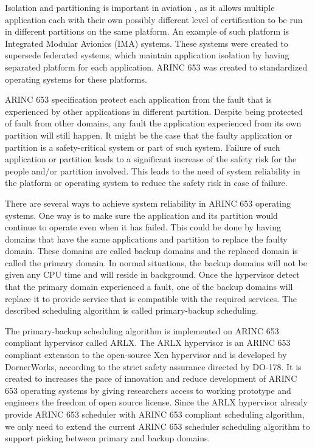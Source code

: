 \documentclass[conference]{IEEEtran}
\begin{document}
Isolation and partitioning is important in aviation \cite{Rushby2000}, as it allows multiple
application each with their own possibly different level of certification to be run in different
partitions on the same platform. An example of such platform is Integrated Modular Avionics
(IMA) systems. These systems were created to supersede federated systems, which maintain
application isolation by having separated platform for each application. ARINC 653 was created
to standardized operating systems for these platforms.

ARINC 653 specification protect each application from the fault that is experienced by other
applications in different partition. Despite being protected of fault from other domains, any
fault the application experienced from its own partition will still happen. It might be the case
that the faulty application or partition is a safety-critical system or part of such system.
Failure of such application or partition leads to a significant increase of the safety risk for
the people and/or partition involved. This leads to the need of system reliability in the
platform or operating system to reduce the safety risk in case of failure.

There are several ways to achieve system reliability in ARINC 653 operating systems. One way is
to make sure the application and its partition would continue to operate even when it has
failed. This could be done by having domains that have the same applications and partition to
replace the faulty domain. These domains are called backup domains and the replaced domain is
called the primary domain. In normal situations, the backup domains will not be given any CPU
time and will reside in background. Once the hypervisor detect that the primary domain
experienced a fault, one of the backup domains will replace it to provide service that is
compatible with the required services. The described scheduling algorithm is called
primary-backup scheduling.

The primary-backup scheduling algorithm is implemented on ARINC 653 compliant hypervisor called
ARLX. The ARLX hypervisor is an ARINC 653 compliant extension to the open-source Xen hypervisor
and is developed by DornerWorks, according to the strict safety assurance directed by DO-178.
It is created to increases the pace of innovation and reduce development of ARINC 653 operating
systems by giving researchers access to working prototype and engineers the freedom of open
source license. Since the ARLX hypervisor already provide ARINC 653 scheduler with ARINC 653
compliant scheduling algorithm, we only need to extend the current ARINC 653 scheduler
scheduling algorithm to support picking between primary and backup domains.
\end{document}
